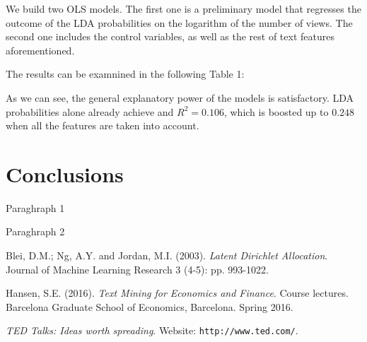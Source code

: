 \documentclass[a4paper, 11pt]{article} %
\begin{document}
We build two OLS models. The first one is a preliminary model that regresses the outcome of the LDA probabilities on the logarithm of the number of views. The second one includes the control variables, as well as the rest of text features aforementioned.

The results can be examnined in the following Table 1:

\begin{center}

\end{center}

As we can see, the general explanatory power of the models is satisfactory. LDA probabilities alone already achieve and $R^2 = 0.106$, which is boosted up to $0.248$ when all the features are taken into account.


\section*{Conclusions}

Paraghraph 1

Paraghraph 2


\medskip


\begin{thebibliography}{9}

Blei, D.M.; Ng, A.Y. and Jordan, M.I. (2003).
\textit{Latent Dirichlet Allocation}.
Journal of Machine Learning Research 3 (4-5): pp. 993-1022.

Hansen, S.E. (2016).
\textit{Text Mining for Economics and Finance}. Course lectures.
Barcelona Graduate School of Economics, Barcelona. Spring 2016. 

\textit{TED Talks: Ideas worth spreading}.
Website: \texttt{http://www.ted.com/}.


\end{thebibliography}
\end{document}

